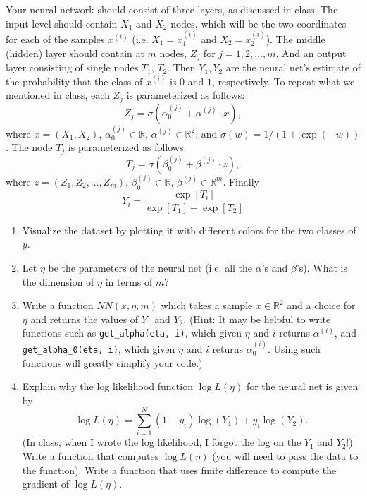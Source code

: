 \documentclass{article}
\begin{document}
\begin{enumerate}
Your neural network should consist of three layers, as discussed in class.  The input level should contain $X_1$ and $X_2$ nodes, which will be the two coordinates for each of the samples $x^{(i)}$ (i.e. $X_1 = x^{(i)}_1$ and $X_2 = x^{(i)}_2$).  The middle (hidden) layer should contain at $m$ nodes, $Z_j$ for $j=1,2,\dots,m$.    And an output layer consisting of single nodes $T_1$, $T_2$.   Then $Y_1, Y_2$ are the neural net's estimate of the probability that the class of $x^{(i)}$ is $0$ and $1$, respectively.   To repeat what we mentioned in class,  each $Z_j$ is parameterized as follows:
\begin{equation}
Z_j = \sigma(\alpha_0^{(j)} + \alpha^{(j)} \cdot x),
\end{equation}  
where $x = (X_1, X_2)$, $\alpha_0^{(j)} \in \mathbb{R}$, $\alpha^{(j)} \in \mathbb{R}^2$, and $\sigma(w) = 1/(1 + \exp(-w))$.  The node $T_j$ is parameterized as follows:
\begin{equation}
T_j = \sigma(\beta_0^{(j)}  + \beta^{(j)} \cdot z),
\end{equation}
where $z = (Z_1, Z_2, \dots,Z_m)$, $\beta_0^{(j)} \in \mathbb{R}$, $\beta^{(j)} \in \mathbb{R}^m$.  Finally 
\begin{equation}
Y_i = \frac{\exp[T_i]}{\exp[T_1] + \exp[T_2]}
\end{equation}
\begin{enumerate}
\item Visualize the dataset by plotting it with different colors for the two classes of $y$.  
\item Let $\eta$ be the parameters of the neural net (i.e. all the $\alpha$'s and $\beta$'s).  What is the dimension of $\eta$ in terms of $m$?
\item Write a function $NN(x, \eta, m)$ which takes a sample $x \in \mathbb{R}^2$ and a choice for $\eta$ and returns the values of $Y_1$ and $Y_2$.  (Hint:  It may be helpful to write functions such as \verb+get_alpha(eta, i)+, which given $\eta$ and $i$ returns $\alpha^{(i)}$,  and \verb+get_alpha_0(eta, i)+, which given $\eta$ and $i$  returns $\alpha^{(i)}_0$.  Using such functions will greatly simplify your code.)
\item Explain why the log likelihood function $\log L(\eta)$ for the neural net  is given by
\begin{equation}
\log L(\eta) = \sum_{i=1}^N (1-y_i) \log(Y_1) + y_i \log(Y_2).
\end{equation}
(In class, when I wrote the log likelihood, I forgot the log on the $Y_1$ and $Y_2$!)   Write a function that computes $\log L(\eta)$ (you will need to pass the data to the function).  Write a function that uses finite difference to compute the gradient of $\log L(\eta)$.

\end{enumerate}
\end{enumerate}
\end{document}
